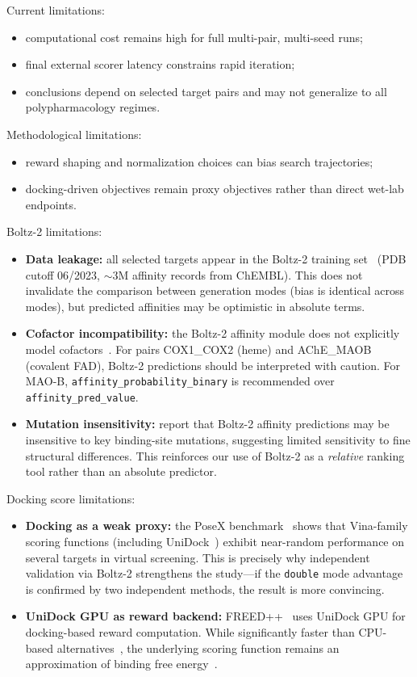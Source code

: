 Current limitations:
\begin{itemize}
\item computational cost remains high for full multi-pair, multi-seed runs;
\item final external scorer latency constrains rapid iteration;
\item conclusions depend on selected target pairs and may not generalize
to all polypharmacology regimes.
\end{itemize}

Methodological limitations:
\begin{itemize}
\item reward shaping and normalization choices can bias search trajectories;
\item docking-driven objectives remain proxy objectives rather than direct wet-lab endpoints.
\end{itemize}

Boltz-2 limitations:
\begin{itemize}
\item \textbf{Data leakage:} all selected targets appear in the Boltz-2 training
set~\citep{passaro2025boltz2} (PDB cutoff 06/2023, $\sim$3M affinity records from
ChEMBL).  This does not invalidate the comparison between generation modes (bias is
identical across modes), but predicted affinities may be optimistic in absolute terms.
\item \textbf{Cofactor incompatibility:} the Boltz-2 affinity module does not
explicitly model cofactors~\citep{passaro2025boltz2}.  For pairs COX1\_COX2 (heme)
and AChE\_MAOB (covalent FAD), Boltz-2 predictions should be interpreted with
caution.  For MAO-B, \texttt{affinity\_probability\_binary} is recommended over
\texttt{affinity\_pred\_value}.
\item \textbf{Mutation insensitivity:} \citet{bret2026boltz2docking} report that
Boltz-2 affinity predictions may be insensitive to key binding-site mutations,
suggesting limited sensitivity to fine structural differences.  This reinforces
our use of Boltz-2 as a \emph{relative} ranking tool rather than an absolute
predictor.
\end{itemize}

Docking score limitations:
\begin{itemize}
\item \textbf{Docking as a weak proxy:} the PoseX benchmark~\citep{posex2025}
shows that Vina-family scoring functions (including
UniDock~\citep{yu2023unidock}) exhibit near-random performance on several
targets in virtual screening.  This is precisely why independent validation
via Boltz-2 strengthens the study---if the \texttt{double} mode advantage is
confirmed by two independent methods, the result is more convincing.
\item \textbf{UniDock GPU as reward backend:}
FREED++~\citep{telepov2023freedpp} uses UniDock GPU for docking-based reward
computation.  While significantly faster than CPU-based
alternatives~\citep{trott2010vina}, the underlying scoring function remains an
approximation of binding free energy~\citep{su2019casf2016}.
\end{itemize}

